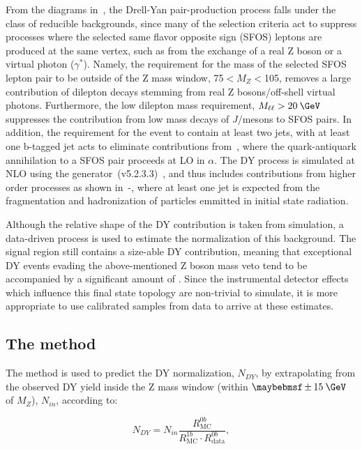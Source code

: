 From the diagrams in~, the Drell-Yan pair-production process falls under the class of reducible backgrounds, since many of the selection criteria act to suppress processes where the selected same flavor opposite sign (SFOS) leptons are produced at the same vertex, such as from the exchange of a real Z boson or a virtual photon ($\gamma^{*}$). Namely, the requirement for the mass of the selected SFOS lepton pair to be outside of the Z mass window, 75\:\GeV$< M_{Z} <$105\:\GeV, removes a large contribution of dilepton decays stemming from real Z bosons/off-shell virtual photons. Furthermore, the low dilepton mass requirement, $M_{\ell\ell}>20\:\GeV$ suppresses the contribution from low mass decays of $J/$\psi mesons to SFOS pairs. In addition, the requirement for the event to contain at least two jets, with at least one b-tagged jet acts to eliminate contributions from~, where the quark-antiquark annihilation to a SFOS pair proceeds at LO in $\alpha$. The DY process is simulated at NLO using the \AMCATNLO generator~(v5.2.3.3)~\cite{Alwall:2014hca}, and thus includes contributions from higher order processes as shown in~-, where at least one jet is expected from the fragmentation and hadronization of particles emmitted in initial state radiation.

Although the relative shape of the DY contribution is taken from simulation, a data-driven process is used to estimate the normalization of this background. The signal region still contains a size-able DY contribution, meaning that exceptional DY events evading the above-mentioned Z boson mass veto tend to be accompanied by a significant amount of \ptmiss. Since the instrumental detector effects which influence this final state topology are non-trivial to simulate, it is more appropriate to use calibrated samples from data to arrive at these estimates.  

\subsection{The \Rinout method}

The method is used to predict the DY normalization, $N_{DY}$, by extrapolating from the observed DY yield inside the Z mass window (within $\pm15\:\GeV$ of $M_{Z}$), $N_{in}$, according to:

\begin{equation}
  N_{DY} = N_{in}\frac{R^{0b}_{\mathrm{MC}}}{R^{1b}_{\mathrm{MC}}\cdot R^{0b}_{\mathrm{data}}},
  \label{eq:NDY}
\end{equation}

